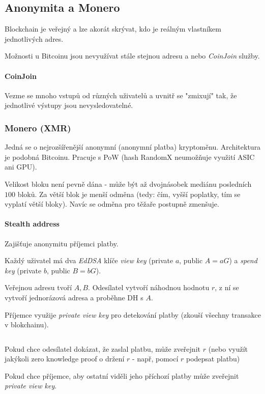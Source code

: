 \documentclass[10pt,a4paper]{article}
\begin{document}
\subsection{Anonymita a Monero}
Blockchain je veřejný a lze akorát skrývat, kdo je reálným vlastníkem jednotlivých adres.

Možnosti u Bitcoinu jsou nevyužívat stále stejnou adresu a nebo \textit{CoinJoin} služby.
	
\paragraph{CoinJoin} 
Vezme se mnoho vstupů od různých uživatelů a uvnitř se "zmixují" tak, že jednotlivé výstupy jsou nevysledovatelné.


\subsubsection*{Monero (XMR)}
Jedná se o nejrozšířenější anonymní (anonymní platba) kryptoměnu.
Architektura je podobná Bitcoinu. 
Pracuje s PoW (hash RandomX neumožňuje využití ASIC ani GPU).


Velikost bloku není pevně dána - může být až dvojnásobek mediánu posledních $ 100 $ bloků.
Za větší blok je menší odměna (tedy: čím, vyšší poplatky, tím se vyplatí větší bloky).
Navíc se odměna pro těžaře postupně zmenšuje.

\paragraph{Stealth address}
Zajišťuje anonymitu příjemci platby.

Každý uživatel má dva \textit{EdDSA} klíče \textit{view key} (private $ a $, public $ A = aG $) a \textit{spend key} (private $ b $, public $ B = bG $).

Veřejnou adresu tvoří $ A, B $. 
Odesílatel vytvoří náhodnou hodnotu $ r $, z ní se vytvoří jednorázová adresa a proběhne DH s $ A $.

Příjemce využije \textit{private view key} pro detekování platby (zkouší všechny transakce v blokchainu).

$ $

Pokud chce odesílatel dokázat, že zaslal platbu, může zveřejnit $ r $  (nebo využít jakýkoli zero knowledge proof o držení $ r $ - např, pomocí $ r $ podepsat platbu)

Pokud chce příjemce, aby ostatní viděli jeho příchozí platby může zveřejnit \textit{private view key}.
\end{document}
